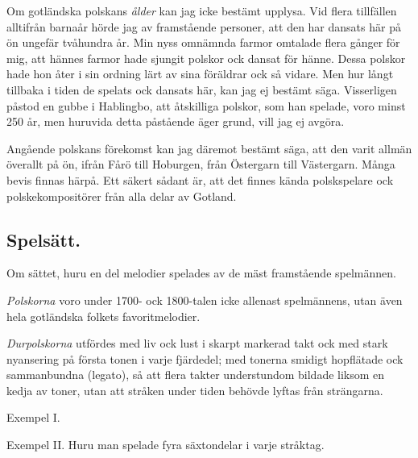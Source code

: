 {Om gotländska polskans \textit{ålder} kan jag icke bestämt upplysa. Vid flera tillfällen alltifrån barnaår hörde jag av framstående personer, att den har dansats här på ön ungefär tvåhundra år. Min nyss omnämnda farmor omtalade flera gånger för mig, att hännes farmor hade sjungit polskor ock dansat för hänne. Dessa polskor hade hon åter i sin ordning lärt av sina föräldrar ock så vidare. Men hur långt tillbaka i tiden
de spelats ock dansats här, kan jag ej bestämt säga. Visserligen påstod en gubbe i Hablingbo, att åtskilliga polskor, som han spelade, voro minst 250 år, men huruvida detta påstående äger grund, vill jag ej avgöra.

Angående polskans förekomst kan jag däremot bestämt säga, att den varit allmän överallt på ön, ifrån Fårö till Hoburgen, från Östergarn till Västergarn. Många bevis finnas härpå. Ett säkert sådant är, att det finnes kända polskspelare ock polskekompositörer från alla delar av Gotland.


\setlength{\parindent}{0mm}
\newpage

\subsection*{\centering Spelsätt.}
\vspace{5mm}

Om sättet, huru en del melodier spelades av de mäst framstående spelmännen.

\vspace{5mm}

\textit{Polskorna} voro under 1700- ock 1800-talen icke allenast spelmännens, utan även hela gotländska folkets favoritmelodier.

\vspace{5mm}

\textit{Durpolskorna} utfördes med liv ock lust i skarpt markerad takt ock med stark nyansering på första tonen i varje fjärdedel; med tonerna smidigt hopflätade ock sammanbundna (legato), så att flera takter understundom bildade liksom en kedja av toner, utan att stråken under tiden behövde lyftas från strängarna.

\vspace{5mm}

Exempel I.


\vspace{5mm}

Exempel II. Huru man spelade fyra säxtondelar i varje \guillemotright{}stråktag\guillemotright{}.

}
